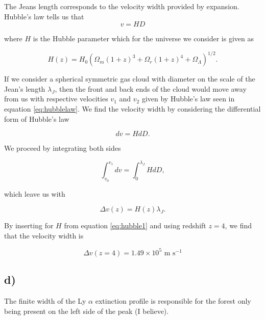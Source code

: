 \documentclass[a4paper]{article}
\begin{document}
The Jeans length corresponds to the velocity width provided by expansion.
Hubble's law tells us that
\begin{equation}\label{eq:hubblelaw}
   v = HD 
\end{equation}

\noindent where $H$ is the Hubble parameter which for the universe we
consider is given as

\begin{equation}\label{eq:hubble1}
       H( z ) = H _ { 0 } \left( \Omega _ { m } ( 1 + z ) ^ { 3 } + \Omega
    _ { r } ( 1 + z ) ^ { 4 } + \Omega _ { \Lambda } \right)^{1/2}.
\end{equation}

\noindent If we consider a spherical symmetric gas
cloud with diameter on the scale of the Jean's length $\lambda_J$, then
the front and back ends of the cloud would move away from us with
respective velocities $v_1$ and $v_2$ given by
Hubble's law seen in equation \eqref{eq:hubblelaw}. We find the velocity
width by considering the differential form of Hubble's law

\begin{equation*}
    dv = H dD.
\end{equation*}

\noindent We proceed by integrating both sides

\begin{equation*}
    \int_{v_0}^{v_1} dv = \int_0^{\lambda_J} H dD,
\end{equation*}

\noindent which leave us with

\begin{equation}\label{eq:velwidth}
    \Delta v(z) = H(z)\lambda_J.
\end{equation}

\noindent By inserting for $H$ from equation \eqref{eq:hubble1} and using
redshift $z=4$, we find that the velocity width is 

\begin{equation}\label{velwidth results}
    \Delta v(z=4) = 1.49 \times 10^5 \textrm{ m s}^{-1}
\end{equation}

\subsection*{d)}

The finite width of the Ly $\alpha$ extinction profile is responsible for the forest only being present on the left side of the peak (I believe). 
\end{document}
